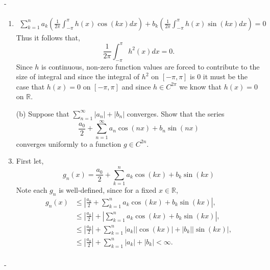 \documentclass[12pt]{article}
\makeatletter
\theoremstyle{ex215}
\newcounter{probcount}
\newlength\probsep
\newlength\pshrinking
\newenvironment{problems}%
  {\ifhmode\unskip\par\fi\setcounter{probcount}{0}\probsep\parskip
  \sbox\@tempboxa{\textbf{9.}}\pshrinking\wd\@tempboxa\advance\pshrinking\labelsep
  \advance\linewidth -\pshrinking
  \advance\@totalleftmargin\pshrinking
  \advance\leftskip\pshrinking}%
  {\ifhmode\unskip \par\fi\advance\leftskip-\pshrinking}%
\renewenvironment{proof}[1][\proofname]{\par
  \pushQED{\qed}%
  \normalfont \topsep6\p@\@plus6\p@\relax
  \trivlist
  \@topsep \topsep
  \item[\hskip\labelsep
        \itshape
    #1\@addpunct{.}]\ignorespaces
}{%
  \popQED\endtrivlist\@endpefalse
}
\newcommand{\Reals}{\ensuremath{\mathbb R}}
\newcommand{\abs}[1]{\left| #1 \right|}
\let\RR\Reals
\makeatother
\begin{document}
\begin{problems}
\begin{enumerate}
\begin{proof}
\begin{multline*}
        \sum_{k = 1}^n a_k \left(\frac{1}{2\pi}\int_{-\pi}^{\pi} h(x)\cos(kx)dx \right) + b_k\left(\frac{1}{2\pi}\int_{-\pi}^{\pi} h(x)\sin(kx)dx\right)=0
      \end{multline*}
      Thus it follows that, 
      \begin{equation*}
        \frac{1}{2\pi}\int_{-\pi}^{\pi} h^2(x)dx = 0.
      \end{equation*}
      Since $h$ is continuous, non-zero function values are forced to contribute to the size of integral and since the integral of $h^2$ on $[-\pi, \pi]$ is 0 it must be the case that $h(x) = 0$ on $[-\pi, \pi]$ and since $h \in C^{2\pi}$ we know that $h(x) = 0$ on $\RR$.
    






  \end{proof}
    







  \item[(b)] Suppose that $\sum_{n = 1}^\infty |a_n| + |b_n|$ converges. Show that the series
  \begin{equation*}
    \frac{a_0}{2} + \sum_{n = 1}^\infty a_n\cos(nx) + b_n\sin(nx)
  \end{equation*} 
  converges uniformly to a function $g \in C^{2n}$. 
  \begin{proof} First let, 
    \begin{equation*}
      g_n(x) = \frac{a_0}{2} + \sum_{k = 1}^n a_k\cos(kx) + b_k\sin(kx)
    \end{equation*}
    Note each $g_n$ is well-defined, since for a fixed $x \in \RR$, 
    \begin{align*}
      g_n(x) &\leq \abs{\frac{a_0}{2} + \sum_{k = 1}^n a_k\cos(kx) + b_k\sin(kx)},\\
      &\leq \abs{\frac{a_0}{2}} + \abs{\sum_{k = 1}^n a_k\cos(kx) + b_k\sin(kx)},\\
      &\leq \abs{\frac{a_0}{2}} + \sum_{k = 1}^n \abs{a_k}\abs{\cos(kx)} + \abs{b_k}\abs{\sin(kx)},\\
      &\leq \abs{\frac{a_0}{2}} + \sum_{k = 1}^n \abs{a_k} + \abs{b_k} < \infty. \\
    \end{align*}


\end{proof}
\end{enumerate}
\end{problems}
\end{document}
